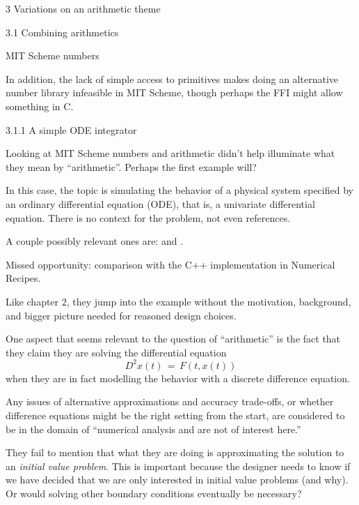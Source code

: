 \documentclass[12pt]{PalisadesLakesBook}
\begin{document}
\begin{plSection}{3 Variations on an arithmetic theme}
\begin{plSection}{3.1 Combining arithmetics}
\begin{plSection}{MIT Scheme numbers}
\begin{description}
In addition, the lack of simple access to primitives
makes doing an alternative number library infeasible
in MIT Scheme, though perhaps the FFI might allow something
in C.~\cite{Birkholz:2018:MITSchemeSOS}
\end{description}

\end{plSection}%
\begin{plSection}{3.1.1 A simple ODE integrator}

Looking at MIT Scheme numbers and arithmetic didn't help
illuminate what they mean by ``arithmetic''.
Perhaps the first example will?

In this case, the topic is simulating the behavior 
of a physical system specified by an ordinary differential
equation (ODE), that is, a univariate differential equation.
There is no context for the problem, not even references.

A couple possibly relevant ones are: 
and
.

Missed opportunity: comparison with the C++ implementation
in  Numerical Recipes.

Like chapter 2, they jump into the example
without the motivation, background, and bigger picture 
needed for reasoned design choices.

One aspect that seems relevant to the question of ``arithmetic''
is the fact that they claim they are solving the differential
equation
\begin{equation}
D^{2} x \left( t \right) \, = \, F\left(t,x\left(t\right)\right)
\end{equation}
when they are in fact modelling the behavior 
with a discrete difference equation.

Any issues of alternative approximations and accuracy trade-offs,
or whether difference equations might be the right setting from 
the start,
are considered to be in the domain of ``numerical analysis
and are not of interest here.''

They fail to mention that what they are doing is
approximating the solution to an \emph{initial value problem}.
This is important because the designer needs to know if
we have decided that we are only interested in initial value
problems (and why). Or would solving other boundary conditions
eventually be necessary?


\end{plSection}
\end{plSection}
\end{plSection}
\end{document}
